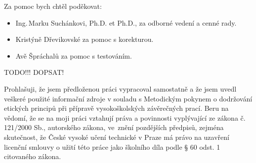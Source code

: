 \documentclass[czech,master,unicode,oneside]{ctufit-thesis}
\begin{document}
 
\frontmatter\frontmatterinit %
\thispagestyle{empty}\maketitle\thispagestyle{empty}\cleardoublepage %


\imprintpage %
\stopTOCentries

\begin{acknowledgmentpage}
    Za pomoc bych chtěl poděkovat:
    \begin{itemize}
        \item Ing.\,Marku Suchánkovi, Ph.D. et Ph.D., za odborné vedení a cenné rady.
        \item Kristýně Dřevikovské za pomoc s korekturou.
        \item Avě Špráchalů za pomoc s testováním.
    \end{itemize}

    TODO!!!  DOPSAT!
\end{acknowledgmentpage} 


\begin{declarationpage}
Prohlašuji, že jsem předloženou práci vypracoval samostatně a že jsem uvedl veškeré
použité informační zdroje v souladu s Metodickým pokynem o dodržování etických
principů při přípravě vysokoškolských závěrečných prací.
Beru na vědomí, že se na moji práci vztahují práva a povinnosti vyplývající ze zákona
č. 121/2000 Sb., autorského zákona, ve~znění pozdějších předpisů, zejména
skutečnost, že České vysoké učení technické v Praze má právo na uzavření licenční
smlouvy o užití této práce jako školního díla podle § 60 odst. 1 citovaného zákona.
\end{declarationpage}
\end{document}
